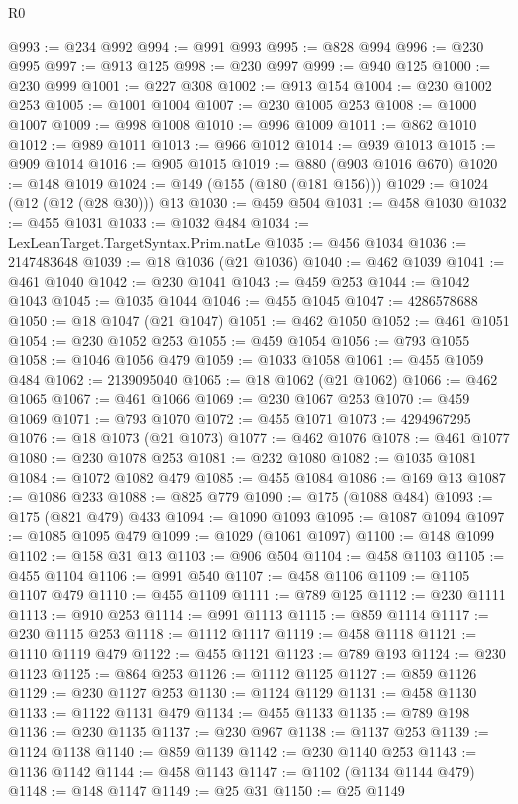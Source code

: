 \begin{lexlean}{R0}
\begin{coremodule}
@993 := @234 @992
@994 := @991 @993
@995 := @828 @994
@996 := @230 @995
@997 := @913 @125
@998 := @230 @997
@999 := @940 @125
@1000 := @230 @999
@1001 := @227 @308
@1002 := @913 @154
@1004 := @230 @1002 @253
@1005 := @1001 @1004
@1007 := @230 @1005 @253
@1008 := @1000 @1007
@1009 := @998 @1008
@1010 := @996 @1009
@1011 := @862 @1010
@1012 := @989 @1011
@1013 := @966 @1012
@1014 := @939 @1013
@1015 := @909 @1014
@1016 := @905 @1015
@1019 := @880 (@903 @1016 @670)
@1020 := @148 @1019
@1024 := @149 (@155 (@180 (@181 @156)))
@1029 := @1024 (@12 (@12 (@28 @30))) @13
@1030 := @459 @504
@1031 := @458 @1030
@1032 := @455 @1031
@1033 := @1032 @484
@1034 := LexLeanTarget.TargetSyntax.Prim.natLe
@1035 := @456 @1034
@1036 := 2147483648
@1039 := @18 @1036 (@21 @1036)
@1040 := @462 @1039
@1041 := @461 @1040
@1042 := @230 @1041
@1043 := @459 @253
@1044 := @1042 @1043
@1045 := @1035 @1044
@1046 := @455 @1045
@1047 := 4286578688
@1050 := @18 @1047 (@21 @1047)
@1051 := @462 @1050
@1052 := @461 @1051
@1054 := @230 @1052 @253
@1055 := @459 @1054
@1056 := @793 @1055
@1058 := @1046 @1056 @479
@1059 := @1033 @1058
@1061 := @455 @1059 @484
@1062 := 2139095040
@1065 := @18 @1062 (@21 @1062)
@1066 := @462 @1065
@1067 := @461 @1066
@1069 := @230 @1067 @253
@1070 := @459 @1069
@1071 := @793 @1070
@1072 := @455 @1071
@1073 := 4294967295
@1076 := @18 @1073 (@21 @1073)
@1077 := @462 @1076
@1078 := @461 @1077
@1080 := @230 @1078 @253
@1081 := @232 @1080
@1082 := @1035 @1081
@1084 := @1072 @1082 @479
@1085 := @455 @1084
@1086 := @169 @13
@1087 := @1086 @233
@1088 := @825 @779
@1090 := @175 (@1088 @484)
@1093 := @175 (@821 @479) @433
@1094 := @1090 @1093
@1095 := @1087 @1094
@1097 := @1085 @1095 @479
@1099 := @1029 (@1061 @1097)
@1100 := @148 @1099
@1102 := @158 @31 @13
@1103 := @906 @504
@1104 := @458 @1103
@1105 := @455 @1104
@1106 := @991 @540
@1107 := @458 @1106
@1109 := @1105 @1107 @479
@1110 := @455 @1109
@1111 := @789 @125
@1112 := @230 @1111
@1113 := @910 @253
@1114 := @991 @1113
@1115 := @859 @1114
@1117 := @230 @1115 @253
@1118 := @1112 @1117
@1119 := @458 @1118
@1121 := @1110 @1119 @479
@1122 := @455 @1121
@1123 := @789 @193
@1124 := @230 @1123
@1125 := @864 @253
@1126 := @1112 @1125
@1127 := @859 @1126
@1129 := @230 @1127 @253
@1130 := @1124 @1129
@1131 := @458 @1130
@1133 := @1122 @1131 @479
@1134 := @455 @1133
@1135 := @789 @198
@1136 := @230 @1135
@1137 := @230 @967
@1138 := @1137 @253
@1139 := @1124 @1138
@1140 := @859 @1139
@1142 := @230 @1140 @253
@1143 := @1136 @1142
@1144 := @458 @1143
@1147 := @1102 (@1134 @1144 @479)
@1148 := @148 @1147
@1149 := @25 @31
@1150 := @25 @1149

\end{coremodule}
\end{lexlean}
